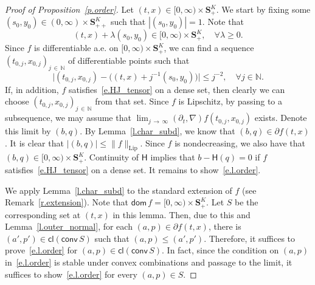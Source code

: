 \documentclass[10pt]{amsart}
\theoremstyle{definition}\newtheorem{defi}[theo]{Definition}\newtheorem{rema}[theo]{Remark}\newtheorem{exam}[theo]{Example}\newtheorem{exem}[theo]{Example}\newtheorem{nota}[theo]{Notation}
\newcommand{\N}{\mathbb{N}}
\renewcommand{\S}{\mathbf{S}}
\newcommand{\Lip}{\mathrm{Lip}}
\renewcommand{\H}{\mathsf{H}}
\newcommand{\dom}{\mathsf{dom}}
\newcommand{\cl}{\mathsf{cl}}
\newcommand{\conv}{\mathsf{conv}}
\renewcommand{\leq}{\leqslant}
\renewcommand{\geq}{\geqslant}
\let\oldforall\forall
\renewcommand*{\forall}{\mathrel{\oldforall}}
\begin{document}
\begin{proof}[Proof of Proposition~\ref{p.order}]
Let $(t,x)\in [0,\infty)\times \S^K_+$. We start by fixing some $(s_0,y_0)\in (0,\infty)\times \S^K_{++}$ such that $|(s_0,y_0)|=1$. Note that
\[
(t,x) +\lambda (s_0,y_0)\in [0,\infty)\times\S^K_+,\quad\forall \lambda \geq 0.
\]
Since $f$ is differentiable a.e. on $[0,\infty)\times \S^K_+$, we can find a sequence $(t_{0,j},x_{0,j})_{j\,\in\,\N}$ of differentiable points such that
\begin{equation}\label{e.t_0,j}
\big|\left(t_{0,j},x_{0,j}\right)-\big((t,x)+j^{-1}(s_0,y_0)\big)\big|\leq j^{-2},\quad\forall j\in\N.
\end{equation}
If, in addition, $f$ satisfies~\eqref{e.HJ_tensor} on a dense set, then clearly we can choose $(t_{0,j},x_{0,j})_{j\,\in\,\N}$ from that set. Since $f$ is Lipschitz, by passing to a subsequence, we may assume that $\lim_{j\,\to\,\infty}(\partial_t,\nabla)f(t_{0,j},x_{0,j})$ exists. Denote this limit by $(b,q)$. By Lemma~\ref{l.char_subd}, we know that $(b,q)\in\partial f(t,x)$. It is clear that $|(b,q)|\leq \|f\|_{\Lip}$. Since $f$ is nondecreasing, we also have that $(b,q)\in[0,\infty)\times \S^K_+$. Continuity of $\H$ implies that $b-\H(q)=0$ if $f$ satisfies~\eqref{e.HJ_tensor} on a dense set. It remains to show~\eqref{e.l.order}.



We apply Lemma~\ref{l.char_subd} to the standard extension of $f$ {(see Remark~\ref{r.extension})}. Note that $\dom\, f= [0,\infty)\times \S^K_+$. Let $S$ be the corresponding set at $(t,x)$ in this lemma. Then, due to this and Lemma~\ref{l.outer_normal}, for each $(a,p) \in \partial f(t,x)$, there is $(a',p')\in \cl(\conv\, S)$ such that $(a,p)\leq (a',p')$. Therefore, it suffices to prove~\eqref{e.l.order} for $(a,p)\in \cl(\conv\, S)$. In fact, since the condition on $(a,p)$ in~\eqref{e.l.order} is stable under convex combinations and passage to the limit, it suffices to show~\eqref{e.l.order} for every $(a,p) \in S$.


\end{proof}
\end{document}
